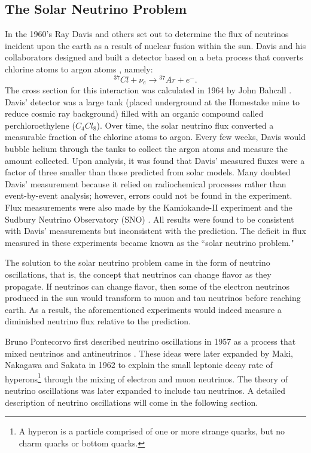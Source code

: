 \subsection{The Solar Neutrino Problem}

In the 1960's Ray Davis and others set out to determine the flux of neutrinos
incident upon the earth as a result of nuclear fusion within the sun.  Davis
and his collaborators designed and built a detector based on a beta process
that converts chlorine atoms to argon atoms , namely:
\begin{equation}\label{nuChlorCap}
{}^{37}Cl + \nu_e  \rightarrow {}^{37}Ar + e^-.
\end{equation}
The cross section for this interaction was calculated in 1964 by John Bahcall
\cite{bahcall}.  Davis' detector was a large tank (placed underground at the
Homestake mine to reduce cosmic ray background) filled with an organic compound
called perchloroethylene ($C_4Cl_8$).  \cite{davis}  Over time, the solar
neutrino flux converted a measurable fraction of the chlorine atoms to argon.
Every few weeks, Davis would bubble helium through the tanks to collect the
argon atoms and measure the amount collected.  Upon analysis, it was found that
Davis' measured fluxes were a factor of three smaller than those predicted from
solar models.  Many doubted Davis' measurement because it relied on
radiochemical processes rather than event-by-event analysis; however, errors
could not be found in the experiment.  Flux measurements were also made by the
Kamiokande-II experiment and the Sudbury Neutrino Observatory (SNO)
\cite{kamiokande, sno}.
All results were found to be consistent with Davis' measurements but
inconsistent with the prediction.  The deficit in flux measured in these
experiments became known as the ``solar neutrino problem."


The solution to the solar neutrino problem came in the form of neutrino
oscillations, that is, the concept that neutrinos can change flavor as they
propagate.  If neutrinos can change flavor, then some of the electron neutrinos
produced in the sun would transform to muon and tau neutrinos before reaching
earth.  As a result, the aforementioned experiments would indeed measure a
diminished neutrino flux relative to the prediction.


Bruno Pontecorvo first described neutrino oscillations in 1957 as a process
that mixed neutrinos and antineutrinos  \cite{pontecorvo}.  These ideas were
later expanded by Maki, Nakagawa and Sakata in 1962 to explain the small
leptonic decay rate of hyperons\footnote{A hyperon is a particle comprised of
one or more strange quarks, but no charm quarks or bottom quarks.} through the
mixing of electron and muon neutrinos.  The theory of neutrino oscillations was
later expanded to include tau neutrinos.  A detailed description of neutrino
oscillations will come in the following section.


